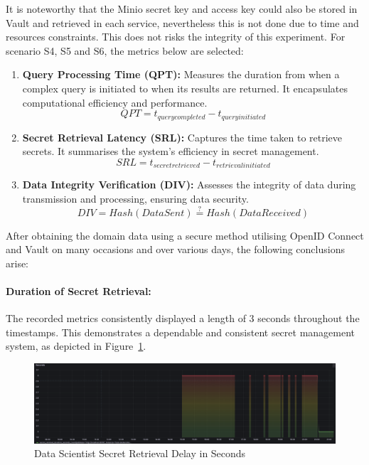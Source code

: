 \documentclass[preprint,12pt]{elsarticle}
\begin{document}
It is noteworthy that the Minio secret key and access key could also be stored in Vault and retrieved in each service, nevertheless this is not done due to time and resources constraints. This does not risks the integrity of this experiment. For scenario S4, S5 and S6, the metrics below are selected: 

\begin{enumerate}
  \item \textbf{Query Processing Time (QPT):} Measures the duration from when a complex query is initiated to when its results are returned. It encapsulates computational efficiency and performance.
  \begin{equation}
      QPT = t_{query completed} - t_{query initiated}
  \end{equation}

  \item \textbf{Secret Retrieval Latency (SRL):} Captures the time taken to retrieve secrets. It summarises the system's efficiency in secret management.
  \begin{equation}
      SRL = t_{secret retrieved} - t_{retrieval initiated}
  \end{equation}

  \item \textbf{Data Integrity Verification (DIV):} Assesses the integrity of data during transmission and processing, ensuring data security.
  \begin{equation}
      DIV = Hash(Data Sent) \stackrel{?}{=} Hash(Data Received)
  \end{equation}

\end{enumerate}

After obtaining the domain data using a secure method utilising OpenID Connect and Vault on many occasions and over various days, the following conclusions arise:

\paragraph{Duration of Secret Retrieval:}
The recorded metrics consistently displayed a length of 3 seconds throughout the timestamps. This demonstrates a dependable and consistent secret management system, as depicted in Figure~\ref{dataScientistSecretRetrievalDelayInSeconds}.

\begin{figure}[h]
  \centering
  \includegraphics[width=\textwidth]{images/Secret-Retrieval-Delay-in-Seconds-In-Data-Scientist-Application.png}
  \caption{Data Scientist Secret Retrieval Delay in Seconds }
  \label{dataScientistSecretRetrievalDelayInSeconds}
\end{figure}
\end{document}
